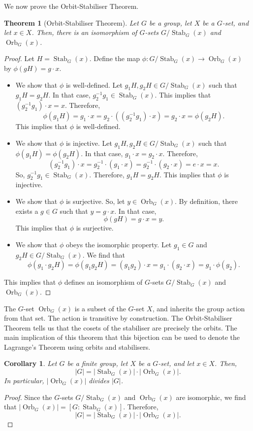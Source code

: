 \documentclass[a4paper, openany]{memoir}
\theoremstyle{definition}
\theoremstyle{plain}
\newtheorem{theorem}[definition]{Theorem}
\newtheorem{corollary}[definition]{Corollary}
\begin{document}
We now prove the Orbit-Stabiliser Theorem.
\begin{theorem}[Orbit-Stabiliser Theorem]
Let $G$ be a group, let $X$ be a $G$-set, and let $x \in X$. Then, there is an isomorphism of $G$-sets $G/\operatorname{Stab}_G(x)$ and $\operatorname{Orb}_G(x)$.
\end{theorem}
\begin{proof}
Let $H = \operatorname{Stab}_G(x)$. Define the map $\phi: G/\operatorname{Stab}_G(x) \to \operatorname{Orb}_G(x)$ by $\phi(gH) = g \cdot x$.
\begin{itemize}
    \item We show that $\phi$ is well-defined. Let $g_1H, g_2H \in G/\operatorname{Stab}_G(x)$ such that $g_1H = g_2H$. In that case, $g_2^{-1}g_1 \in \operatorname{Stab}_G(x)$. This implies that $(g_2^{-1} g_1) \cdot x = x$. Therefore,
    \[\phi(g_1H) = g_1 \cdot x = g_2 \cdot ((g_2^{-1}g_1) \cdot x) = g_2 \cdot x = \phi(g_2H).\]
    This implies that $\phi$ is well-defined.
    \item We show that $\phi$ is injective. Let $g_1H, g_2H \in G/\operatorname{Stab}_G(x)$ such that $\phi(g_1H) = \phi(g_2H)$. In that case, $g_1 \cdot x = g_2 \cdot x$. Therefore,
    \[(g_2^{-1}g_1) \cdot x = g_2^{-1} \cdot (g_1 \cdot x) = g_2^{-1} \cdot (g_2 \cdot x) = e \cdot x = x.\]
    So, $g_2^{-1}g_1 \in \operatorname{Stab}_G(x)$. Therefore, $g_1H = g_2H$. This implies that $\phi$ is injective.
    \item We show that $\phi$ is surjective. So, let $y \in \operatorname{Orb}_G(x)$. By definition, there exists a $g \in G$ such that $y = g \cdot x$. In that case, 
    \[\phi(gH) = g \cdot x = y.\]
    This implies that $\phi$ is surjective.
    \item We show that $\phi$ obeys the isomorphic property. Let $g_1 \in G$ and $g_2H \in G/\operatorname{Stab}_G(x)$. We find that
    \[\phi(g_1 \cdot g_2H) = \phi(g_1g_2H) = (g_1g_2) \cdot x = g_1 \cdot (g_2 \cdot x) = g_1 \cdot \phi(g_2).\]
\end{itemize}
This implies that $\phi$ defines an isomorphism of $G$-sets $G/\operatorname{Stab}_G(x)$ and $\operatorname{Orb}_G(x)$.
\end{proof}
\noindent The $G$-set $\operatorname{Orb}_G(x)$ is a subset of the $G$-set $X$, and inherits the group action from that set. The action is transitive by construction. The Orbit-Stabiliser Theorem tells us that the cosets of the stabiliser are precisely the orbits. The main implication of this theorem that this bijection can be used to denote the Lagrange's Theorem using orbits and stabilisers.
\begin{corollary}
Let $G$ be a finite group, let $X$ be a $G$-set, and let $x \in X$. Then, 
\[|G| = |\operatorname{Stab}_G(x)| \cdot |\operatorname{Orb}_G(x)|.\]
In particular, $|\operatorname{Orb}_G(x)|$ divides $|G|$.
\end{corollary}
\begin{proof} Since the $G$-sets $G/\operatorname{Stab}_G(x)$ and $\operatorname{Orb}_G(x)$ are isomorphic, we find that $|\operatorname{Orb}_G(x)| = [G: \operatorname{Stab}_G(x)]$. Therefore,
\[|G| = |\operatorname{Stab}_G(x)| \cdot |\operatorname{Orb}_G(x)|.\]
\end{proof}
\end{document}
